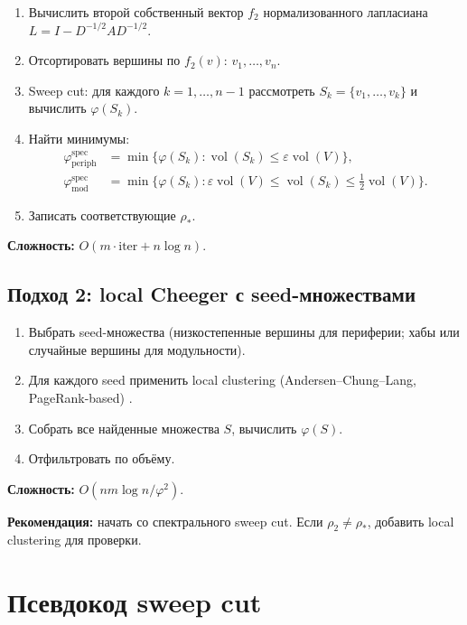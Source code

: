\documentclass[11pt,a4paper]{article}
\theoremstyle{plain}
\theoremstyle{definition}
\theoremstyle{remark}
\DeclareMathOperator{\vol}{vol}
\newcommand{\periph}{\mathrm{periph}}
\newcommand{\modu}{\mathrm{mod}}
\newcommand{\Ph}{\varphi}
\begin{document}
\begin{enumerate}[leftmargin=*]
\item Вычислить второй собственный вектор $f_2$ нормализованного лапласиана
$L=I-D^{-1/2}AD^{-1/2}$.
\item Отсортировать вершины по $f_2(v)$: $v_1,\dots,v_n$.
\item Sweep cut: для каждого $k=1,\dots,n-1$ рассмотреть
$S_k=\{v_1,\dots,v_k\}$ и вычислить $\Ph(S_k)$.
\item Найти минимумы:
\begin{align}
\Ph_{\periph}^{\mathrm{spec}}
&=\min\{\Ph(S_k):\vol(S_k)\le\varepsilon\vol(V)\},\\
\Ph_{\modu}^{\mathrm{spec}}
&=\min\{\Ph(S_k):\varepsilon\vol(V)\le\vol(S_k)\le\tfrac12\vol(V)\}.
\end{align}
\item Записать соответствующие $\rho_*$.
\end{enumerate}

\textbf{Сложность:} $O(m\cdot\mathrm{iter}+n\log n)$.

\subsection*{Подход 2: local Cheeger с seed-множествами}

\begin{enumerate}[leftmargin=*]
\item Выбрать seed-множества (низкостепенные вершины для периферии; хабы или
случайные вершины для модульности).
\item Для каждого seed применить local clustering (Andersen--Chung--Lang,
PageRank-based) \cite{AndersenChungLang2006}.
\item Собрать все найденные множества $S$, вычислить $\Ph(S)$.
\item Отфильтровать по объёму.
\end{enumerate}

\textbf{Сложность:} $O(nm\log n/\Ph^2)$.

\textbf{Рекомендация:} начать со спектрального sweep cut. Если
$\rho_2\ne\rho_*$, добавить local clustering для проверки.

\section{Псевдокод sweep cut}
\label{sec:pseudocode}
\end{document}
